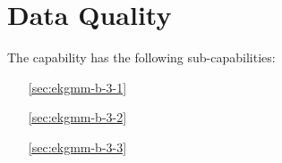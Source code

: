 \chapter{Data Quality}\label{ch:ekgmm-b-3} %

The \currentname capability has the following sub-capabilities:

\begin{itemize}[leftmargin=.5in]
  \item [\ref{sec:ekgmm-b-3-1}] 
  \item [\ref{sec:ekgmm-b-3-2}] 
  \item [\ref{sec:ekgmm-b-3-3}] 
\end{itemize}




